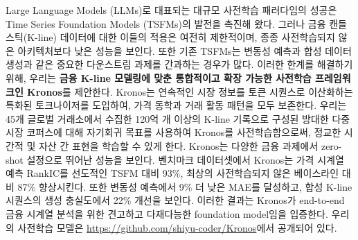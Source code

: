 Large Language Models (LLMs)로 대표되는 대규모 사전학습 패러다임의 성공은 Time Series Foundation Models (TSFMs)의 발전을 촉진해 왔다. 그러나 금융 캔들스틱(K-line) 데이터에 대한 이들의 적용은 여전히 제한적이며, 종종 사전학습되지 않은 아키텍처보다 낮은 성능을 보인다. 또한 기존 TSFMs는 변동성 예측과 합성 데이터 생성과 같은 중요한 다운스트림 과제를 간과하는 경우가 많다. 이러한 한계를 해결하기 위해, 우리는 \textbf{금융 K-line 모델링에 맞춘 통합적이고 확장 가능한 사전학습 프레임워크인 Kronos}를 제안한다. Kronos는 연속적인 시장 정보를 토큰 시퀀스로 이산화하는 특화된 토크나이저를 도입하여, 가격 동학과 거래 활동 패턴을 모두 보존한다. 우리는 45개 글로벌 거래소에서 수집한 120억 개 이상의 K-line 기록으로 구성된 방대한 다중 시장 코퍼스에 대해 자기회귀 목표를 사용하여 Kronos를 사전학습함으로써, 정교한 시간적 및 자산 간 표현을 학습할 수 있게 한다. Kronos는 다양한 금융 과제에서 zero-shot 설정으로 뛰어난 성능을 보인다. 벤치마크 데이터셋에서 Kronos는 가격 시계열 예측 RankIC를 선도적인 TSFM 대비 93\%, 최상의 사전학습되지 않은 베이스라인 대비 87\% 향상시킨다. 또한 변동성 예측에서 9\% 더 낮은 MAE를 달성하고, 합성 K-line 시퀀스의 생성 충실도에서 22\% 개선을 보인다. 이러한 결과는 Kronos가 end-to-end 금융 시계열 분석을 위한 견고하고 다재다능한 foundation model임을 입증한다. 우리의 사전학습 모델은 \url{https://github.com/shiyu-coder/Kronos}에서 공개되어 있다.
